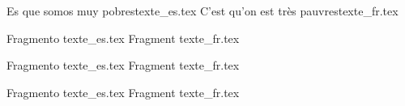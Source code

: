 \documentclass[a5paper]{book}
\begin{document}

%
{Es que somos muy pobres}{texte_es.tex}%
{C'est qu'on est très pauvres}{texte_fr.tex}

%
{Fragmento }{texte_es.tex}%
{Fragment }{texte_fr.tex}

%
{Fragmento }{texte_es.tex}%
{Fragment }{texte_fr.tex}

%
{Fragmento }{texte_es.tex}%
{Fragment }{texte_fr.tex}
\end{document}

